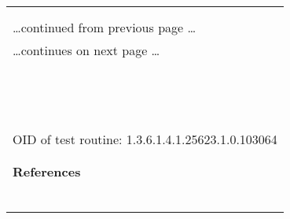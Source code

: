\documentclass{article}
\begin{document}
\begin{longtable}{|p{}|}
\hline
\rowcolor{openvas_warning}{\color{white}{Medium (CVSS: 5.0) }}\\
\rowcolor{openvas_warning}{\color{white}{NVT: OpenSSH Legacy Certificate Signing Information Disclosure Vulnerability}}\\
\hline
\endfirsthead
\hfill\ldots continued from previous page \ldots \\
\hline
\endhead
\hline
\ldots continues on next page \ldots \\
\endfoot
\hline
\endlastfoot
\\
\rowcolor{white}{\verb= Summary:=}\\
\rowcolor{white}{\verb= Checks whether OpenSSH is prone to an information-disclosure vulnerability.=}\\
\rowcolor{white}{\verb=Successful exploits will allow attackers to gain access to sensitive=}\\
\rowcolor{white}{\verb=information; this may lead to further attacks.=}\\
\rowcolor{white}{\verb=Versions 5.6 and 5.7 of OpenSSH are vulnerable.=}\\
\rowcolor{white}{\verb= Vulnerability Detection:=}\\
\rowcolor{white}{\verb= The SSH banner is analysed for presence of openssh and the version=}\\
\rowcolor{white}{\verb=information is then taken from that banner.=}\\
\rowcolor{white}{\verb= Solution:=}\\
\rowcolor{white}{\verb= Updates are available. Please see the references for more information.=}\\
\rowcolor{white}{\verb==}\\
\rowcolor{white}{\verb==}\\
\\
OID of test routine: 1.3.6.1.4.1.25623.1.0.103064\\
\\

      \hline
      \\
\textbf{References}\\
\rowcolor{white}{\verb=CVE: CVE-2011-0539=}\\
\rowcolor{white}{\verb=BID:46155=}\\
\rowcolor{white}{\verb=Other:=}\\
\rowcolor{white}{\verb=  URL:https://www.securityfocus.com/bid/46155=}\\
\rowcolor{white}{\verb=   URL:http://www.openssh.com/txt/release-5.8=}\\
\rowcolor{white}{\verb=   URL:http://www.openssh.com=}\\
\end{longtable}
\end{document}
